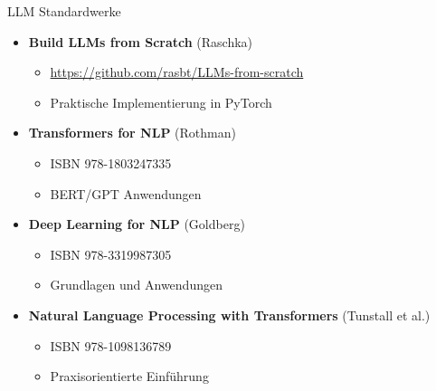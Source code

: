 \documentclass[aspectratio=1610, xcolor=dvipsnames, 9pt]{beamer}
\begin{document}
\begin{frame}{LLM Standardwerke}
\begin{itemize}
\item \textbf{Build LLMs from Scratch} (Raschka)
\begin{itemize}
\item \url{https://github.com/rasbt/LLMs-from-scratch}
\item Praktische Implementierung in PyTorch
\end{itemize}

\item \textbf{Transformers for NLP} (Rothman)
\begin{itemize}
\item ISBN 978-1803247335
\item BERT/GPT Anwendungen
\end{itemize}

\item \textbf{Deep Learning for NLP} (Goldberg)
\begin{itemize}
\item ISBN 978-3319987305
\item Grundlagen und Anwendungen
\end{itemize}

\item \textbf{Natural Language Processing with Transformers} (Tunstall et al.)
\begin{itemize}
\item ISBN 978-1098136789
\item Praxisorientierte Einführung
\end{itemize}
\end{itemize}
\end{frame}
\end{document}
